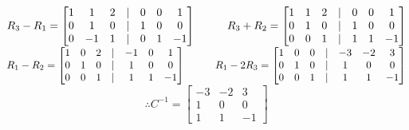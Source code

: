 \documentclass[a4paper]{article}
\newcommand\tab[1][1cm]{\hspace*{#1}}
\begin{document}
$R_3 - R_1 = \begin{bmatrix}
1&1&2&|&0&0&1\\
0&1&0&|&1&0&0\\
0&-1&1&|&0&1&-1
\end{bmatrix} \tab
R_3 + R_2 = \begin{bmatrix}
1&1&2&|&0&0&1\\
0&1&0&|&1&0&0\\
0&0&1&|&1&1&-1
\end{bmatrix}$\\
$R_1 - R_2 = \begin{bmatrix}
1&0&2&|&-1&0&1\\
0&1&0&|&1&0&0\\
0&0&1&|&1&1&-1
\end{bmatrix} \tab
R_1 - 2R_3 = \begin{bmatrix}
1&0&0&|&-3&-2&3\\
0&1&0&|&1&0&0\\
0&0&1&|&1&1&-1
\end{bmatrix}$\\
$$\therefore C^{-1} = \begin{bmatrix}
-3&-2&3\\
1&0&0\\
1&1&-1
\end{bmatrix}$$\\
\end{document}
